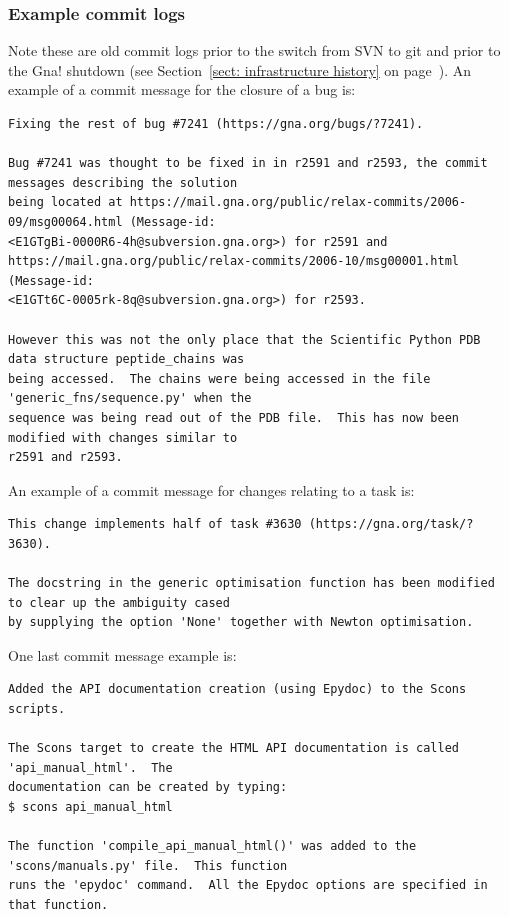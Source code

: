 \subsubsection{Example commit logs}

Note these are old commit logs prior to the switch from SVN to git and prior to the Gna! shutdown (see Section~\ref{sect: infrastructure history} on page~\pageref{sect: infrastructure history}).
An example of a commit message for the closure of a bug is:

\begin{scriptsize}
\begin{verbatim}
Fixing the rest of bug #7241 (https://gna.org/bugs/?7241).

Bug #7241 was thought to be fixed in in r2591 and r2593, the commit messages describing the solution
being located at https://mail.gna.org/public/relax-commits/2006-09/msg00064.html (Message-id:
<E1GTgBi-0000R6-4h@subversion.gna.org>) for r2591 and
https://mail.gna.org/public/relax-commits/2006-10/msg00001.html (Message-id:
<E1GTt6C-0005rk-8q@subversion.gna.org>) for r2593.

However this was not the only place that the Scientific Python PDB data structure peptide_chains was
being accessed.  The chains were being accessed in the file 'generic_fns/sequence.py' when the
sequence was being read out of the PDB file.  This has now been modified with changes similar to
r2591 and r2593.
\end{verbatim}
\end{scriptsize}

An example of a commit message for changes relating to a task is:

\begin{scriptsize}
\begin{verbatim}
This change implements half of task #3630 (https://gna.org/task/?3630).

The docstring in the generic optimisation function has been modified to clear up the ambiguity cased
by supplying the option 'None' together with Newton optimisation.
\end{verbatim}
\end{scriptsize}

One last commit message example is:

\begin{scriptsize}
\begin{verbatim}
Added the API documentation creation (using Epydoc) to the Scons scripts.

The Scons target to create the HTML API documentation is called 'api_manual_html'.  The
documentation can be created by typing:
$ scons api_manual_html

The function 'compile_api_manual_html()' was added to the 'scons/manuals.py' file.  This function
runs the 'epydoc' command.  All the Epydoc options are specified in that function.
\end{verbatim}
\end{scriptsize}



